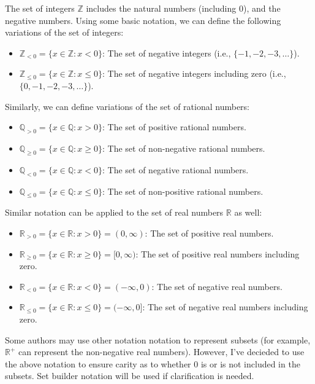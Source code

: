 \documentclass[a4paper, twoside]{article}
\newcommand{\R}{\mathbb{R}}
\newcommand{\Q}{\mathbb{Q}}
\newcommand{\Z}{\mathbb{Z}}
\begin{document}
The set of integers \(\Z\) includes the natural numbers (including 0), and the negative numbers. Using some basic notation, we can define the following variations of the set of integers:

\begin{itemize}
    \item \( \Z_{<0} = \{ x \in \Z : x < 0 \} \): The set of negative integers (i.e., \( \{-1, -2, -3, \ldots\} \)).
    \item \( \Z_{\leq 0} = \{ x \in \Z : x \leq 0 \} \): The set of negative integers including zero (i.e., \( \{0, -1, -2, -3, \ldots\} \)).
\end{itemize}

Similarly, we can define variations of the set of rational numbers:


\begin{itemize}
    \item \(\Q_{> 0} = \{ x \in \Q : x > 0 \}\): The set of positive rational numbers.
    \item \(\Q_{\geq 0} = \{ x \in \Q : x \geq 0 \}\): The set of non-negative rational numbers.
    \item \(\Q_{< 0} = \{ x \in \Q : x < 0 \}\): The set of negative rational numbers.
    \item \(\Q_{\leq 0} = \{ x \in \Q : x \leq 0 \}\): The set of non-positive rational numbers.
\end{itemize}

Similar notation can be applied to the set of real numbers \(\R\) as well:

\begin{itemize}
    \item \(\R_{> 0} = \{ x \in \R : x > 0 \} = (0, \infty)\): The set of positive real numbers.
    \item \(\R_{\geq 0} = \{ x \in \R : x \geq 0 \} = [0, \infty) \): The set of positive real numbers including zero.
    \item \(\R_{< 0} = \{ x \in \R : x < 0 \} = (-\infty, 0)\): The set of negative real numbers.
    \item \(\R_{\leq 0} = \{ x \in \R : x \leq 0 \} = (-\infty, 0]\): The set of negative real numbers including zero.
\end{itemize}

Some authors may use other notation notation to represent subsets (for example, \( \R^+ \) can represent the non-negative real numbers). However, I've decieded to use the above notation to ensure carity as to whether 0 is or is not included in the subsets. Set builder notation will be used if clarification is needed.
\end{document}
